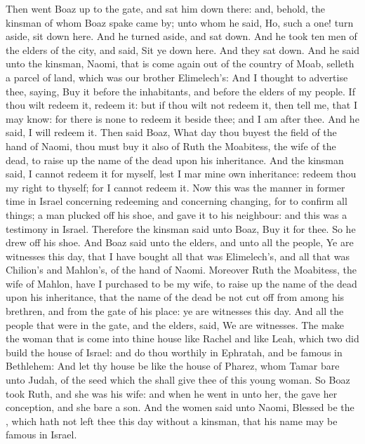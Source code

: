 \begin{biblechapter} %
 Then went Boaz up to the gate, and sat him down there: and, behold, the kinsman of whom Boaz spake came by; unto whom he said, Ho, such a one! turn aside, sit down here. And he turned aside, and sat down.
\verse And he took ten men of the elders of the city, and said, Sit ye down here. And they sat down.
\verse And he said unto the kinsman, Naomi, that is come again out of the country of Moab, selleth a parcel of land, which was our brother Elimelech's:
\verse And I thought to advertise thee, saying, Buy it before the inhabitants, and before the elders of my people. If thou wilt redeem it, redeem it: but if thou wilt not redeem it, then tell me, that I may know: for there is none to redeem it beside thee; and I am after thee. And he said, I will redeem it.
\verse Then said Boaz, What day thou buyest the field of the hand of Naomi, thou must buy it also of Ruth the Moabitess, the wife of the dead, to raise up the name of the dead upon his inheritance.
\verse And the kinsman said, I cannot redeem it for myself, lest I mar mine own inheritance: redeem thou my right to thyself; for I cannot redeem it.
\verse Now this was the manner in former time in Israel concerning redeeming and concerning changing, for to confirm all things; a man plucked off his shoe, and gave it to his neighbour: and this was a testimony in Israel.
\verse Therefore the kinsman said unto Boaz, Buy it for thee. So he drew off his shoe.
\verse And Boaz said unto the elders, and unto all the people, Ye are witnesses this day, that I have bought all that was Elimelech's, and all that was Chilion's and Mahlon's, of the hand of Naomi.
\verse Moreover Ruth the Moabitess, the wife of Mahlon, have I purchased to be my wife, to raise up the name of the dead upon his inheritance, that the name of the dead be not cut off from among his brethren, and from the gate of his place: ye are witnesses this day.
\verse And all the people that were in the gate, and the elders, said, We are witnesses. The \LORD make the woman that is come into thine house like Rachel and like Leah, which two did build the house of Israel: and do thou worthily in Ephratah, and be famous in Bethlehem:
\verse And let thy house be like the house of Pharez, whom Tamar bare unto Judah, of the seed which the \LORD shall give thee of this young woman.
 So Boaz took Ruth, and she was his wife: and when he went in unto her, the \LORD gave her conception, and she bare a son.
\verse And the women said unto Naomi, Blessed be the \LORD, which hath not left thee this day without a kinsman, that his name may be famous in Israel.

\end{biblechapter}
